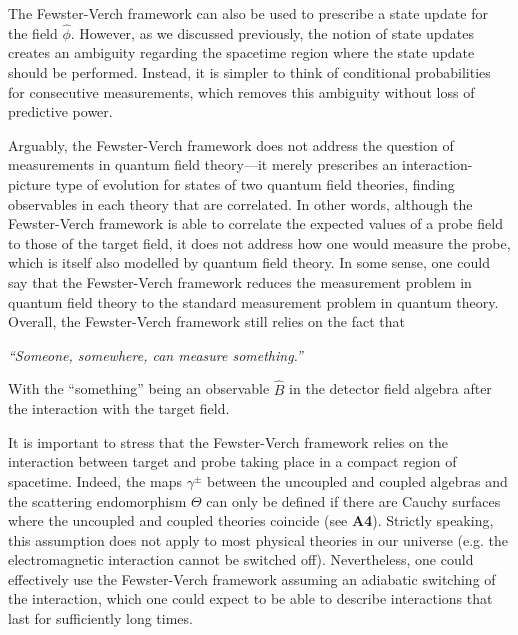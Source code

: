 \documentclass[letterpaper,12pt,titlepage,oneside,final]{book}
\begin{document}
The Fewster-Verch framework can also be used to prescribe a state update for the field $\hat{\phi}$. However, as we discussed previously, the notion of state updates creates an ambiguity regarding the spacetime region where the state update should be performed. Instead, it is simpler to think of conditional probabilities for consecutive measurements, which removes this ambiguity without loss of predictive power.

Arguably, the Fewster-Verch framework does not address the question of measurements in quantum field theory---it merely prescribes an interaction-picture type of evolution for states of two quantum field theories, finding observables in each theory that are correlated. In other words, although the Fewster-Verch framework is able to correlate the expected values of a probe field to those of the target field, it does not address how one would measure the probe, which is itself also modelled by quantum field theory. In some sense, one could say that the Fewster-Verch framework reduces the measurement problem in quantum field theory to the standard measurement problem in quantum theory. Overall, the Fewster-Verch framework still relies on the fact that

\begin{center}
    \textit{``Someone, somewhere, can measure something.''}
\end{center}
With the ``something'' being an observable $\hat{B}$ in the detector field algebra after the interaction with the target field.

It is important to stress that the Fewster-Verch framework relies on the interaction between target and probe taking place in a compact region of spacetime. Indeed, the maps $\gamma^\pm$ between the uncoupled and coupled algebras and the scattering endomorphism $\Theta$ can only be defined if there are Cauchy surfaces where the uncoupled and coupled theories coincide (see \textbf{A4}). Strictly speaking, this assumption does not apply to most physical theories in our universe (e.g. the electromagnetic interaction cannot be switched off). Nevertheless, one could effectively use the Fewster-Verch framework assuming an adiabatic switching of the interaction, which one could expect to be able to describe interactions that last for sufficiently long times. 
\end{document}
